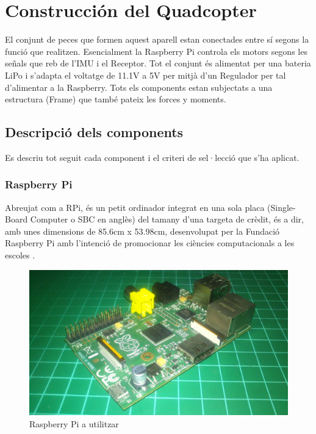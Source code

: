 \documentclass[twoside]{article}
\begin{document}
\newpage
\section{Construcción del Quadcopter} \label{construc}
El conjunt de peces que formen aquest aparell estan conectades entre sí segons la funció que realitzen. Esencialment la Raspberry Pi controla els motors segons les señals que reb de l'IMU i el Receptor. Tot el conjunt és alimentat per una bateria LiPo i s'adapta el voltatge de 11.1V a 5V per mitjà d'un Regulador per tal d'alimentar a la Raspberry. Tots els components estan subjectats a una estructura (Frame) que també pateix les forces y moments.  

\subsection{Descripció dels components}
Es descriu tot seguit cada component i el criteri de sel·lecció que s'ha aplicat.
\subsubsection*{Raspberry Pi} 
Abreujat com a RPi, és un petit ordinador integrat en una sola placa (Single-Board Computer o SBC en anglès) del tamany d'una targeta de crèdit, és a dir, amb unes dimensions de 85.6cm x 53.98cm, desenvolupat per la Fundació Raspberry Pi amb l'intenció de promocionar les ciències computacionals a les escoles \cite{RPiWiki}. 

\begin{figure}[h!]
\begin{center}
\includegraphics[scale=0.06]{images/RPi.jpg}
\caption{Raspberry Pi a utilitzar}
\label{RPiImage}
\end{center}
\end{figure}
\end{document}
